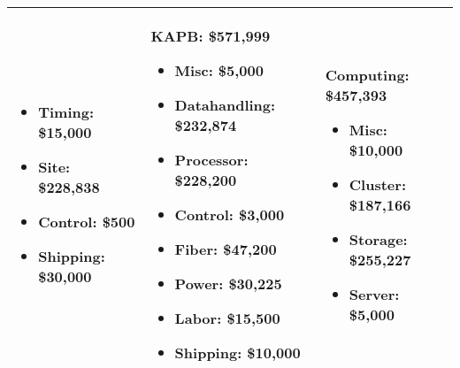 \begin{table}[t]
\begin{tabular}{| p{2in} | p{2in} | p{2in} | }
\begin{itemize}[parsep=-2pt, itemsep=-3pt]
\item Timing:   \$15,000
\item Site:   \$228,838
\item Control:   \$500
\item Shipping:   \$30,000
\end{itemize}
 &
 \noindent
\textbf{KAPB:}  \$571,999
\begin{itemize}[parsep=-2pt, itemsep=-3pt]
\item Misc:   \$5,000
\item Datahandling:   \$232,874
\item Processor:   \$228,200
\item Control:   \$3,000
\item Fiber:   \$47,200
\item Power:   \$30,225
\item Labor:   \$15,500
\item Shipping:   \$10,000
\end{itemize}
 &
 \noindent
\textbf{Computing:}  \$457,393
\begin{itemize}[parsep=-2pt, itemsep=-3pt]
\item Misc:   \$10,000
\item Cluster:   \$187,166
\item Storage:   \$255,227
\item Server:   \$5,000
\end{itemize}
\\ \hline
\end{tabular}
\end{table}
